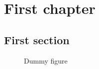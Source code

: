 \documentclass{report}
\begin{document}
\tableofcontents
\chapter{First chapter}

\section{First section}

\begin{figure}
\caption{Dummy figure}
\end{figure}
\end{document}
